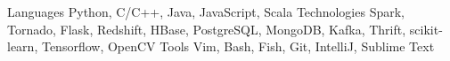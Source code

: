 \begin{cvskills}
  \cvskill
    {Languages}
    {Python, C/C++, Java, JavaScript, Scala}
  \cvskill
    {Technologies}
    {Spark, Tornado, Flask, Redshift, HBase, PostgreSQL, MongoDB, Kafka, Thrift, scikit-learn, Tensorflow, OpenCV}
  \cvskill
    {Tools}
    {Vim, Bash, Fish, Git, IntelliJ, Sublime Text}
\end{cvskills}
